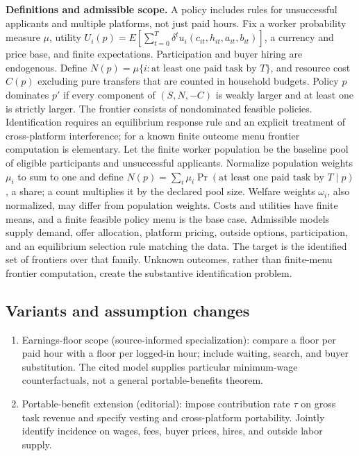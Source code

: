 \documentclass[11pt,a4paper]{article}
\begin{document}
\textbf{Definitions and admissible scope.} A policy includes rules for unsuccessful applicants and multiple platforms, not just paid hours. Fix a worker probability measure \(\mu\), utility \(U_i(p)=E[\sum_{t=0}^T\delta^t u_i(c_{it},h_{it},a_{it},b_{it})]\), a currency and price base, and finite expectations. Participation and buyer hiring are endogenous. Define \(N(p)=\mu\{i:\text{at least one paid task by }T\}\), and resource cost \(C(p)\) excluding pure transfers that are counted in household budgets. Policy \(p\) dominates \(p'\) if every component of \((S,N,-C)\) is weakly larger and at least one is strictly larger. The frontier consists of nondominated feasible policies. Identification requires an equilibrium response rule and an explicit treatment of cross-platform interference; for a known finite outcome menu frontier computation is elementary. Let the finite worker population be the baseline pool of eligible participants and unsuccessful applicants. Normalize population weights \(\mu_i\) to sum to one and define \(N(p)=\sum_i\mu_i\Pr(\text{at least one paid task by }T\mid p)\), a share; a count multiplies it by the declared pool size. Welfare weights \(\omega_i\), also normalized, may differ from population weights. Costs and utilities have finite means, and a finite feasible policy menu is the base case. Admissible models supply demand, offer allocation, platform pricing, outside options, participation, and an equilibrium selection rule matching the data. The target is the identified set of frontiers over that family. Unknown outcomes, rather than finite-menu frontier computation, create the substantive identification problem.
\subsection*{Variants and assumption changes}
\begin{enumerate}
\item Earnings-floor scope (source-informed specialization): compare a floor per paid hour with a floor per logged-in hour; include waiting, search, and buyer substitution. The cited model supplies particular minimum-wage counterfactuals, not a general portable-benefits theorem.
\item Portable-benefit extension (editorial): impose contribution rate \(\tau\) on gross task revenue and specify vesting and cross-platform portability. Jointly identify incidence on wages, fees, buyer prices, hires, and outside labor supply.
\end{enumerate}
\end{document}
